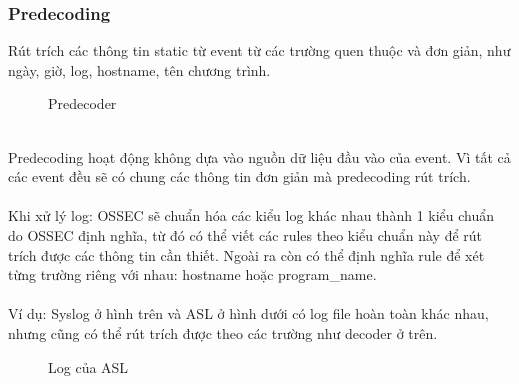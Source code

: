        \subsubsection{Predecoding}
       Rút trích các thông tin static từ event từ các trường
       quen thuộc và đơn giản, như ngày, giờ, log, hostname, tên chương trình.
       \begin{figure}[h!]
	\centering 
{}
	\caption{Predecoder}
  \end{figure}\\
Predecoding hoạt động không dựa vào nguồn dữ liệu đầu vào của
         event. Vì tất cả các event đều sẽ có chung các thông tin đơn giản mà
         predecoding rút trích.\\\\
        Khi xử lý log: OSSEC sẽ chuẩn hóa các kiểu log khác nhau thành 1
         kiểu chuẩn do OSSEC định nghĩa, từ đó có thể viết các rules theo kiểu
         chuẩn này để rút trích được các thông tin cần thiết. Ngoài ra còn có
         thể định nghĩa rule để xét từng trường riêng với nhau: hostname hoặc
         program\_name.\\\\ 
         Ví dụ: Syslog ở hình trên và ASL ở hình dưới có log file hoàn toàn khác
         nhau, nhưng cũng có thể rút trích được theo các trường như decoder ở
         trên.
          \begin{figure}[h!]
	\centering 
{}
	\caption{Log của ASL}
  \end{figure}
